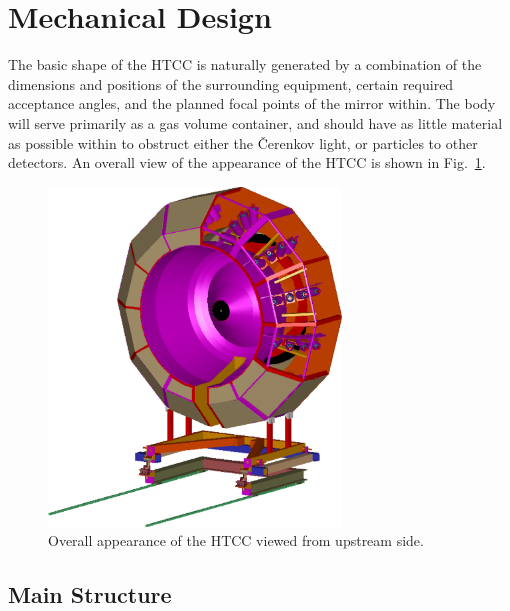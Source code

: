 \section{Mechanical Design}

The basic shape of the HTCC is naturally generated by a combination of 
the dimensions and positions of the surrounding equipment, certain 
required acceptance angles, and the planned focal points of the mirror 
within.  The body will serve primarily as a gas volume container, and 
should have as little material as possible within to obstruct either the 
{\v C}erenkov light, or particles to other detectors.  An overall view of 
the appearance of the HTCC is shown in Fig.~\ref{overall}.
 
\begin{figure}[h]
\vspace{0.5cm}
\begin{centering}
\includegraphics[height=9.0cm,angle=-0]{Mechanical/CD3_Cyril_1.eps}
\hspace{0.1cm}
\caption{\small{Overall appearance of the HTCC viewed from upstream side.}}
\label{overall}
\end{centering}
\end{figure}

\subsection{Main Structure}

